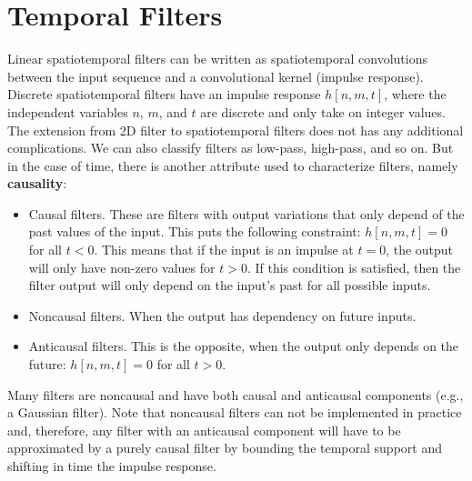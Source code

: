 \section{Temporal Filters}

Linear spatiotemporal filters can be written as spatiotemporal convolutions between the input sequence and a convolutional kernel (impulse response). 
Discrete spatiotemporal filters have an impulse response $h \left[n,m,t \right]$, where the independent variables $n$, $m$, and $t$ are discrete and only take on integer values. The extension from 2D filter to spatiotemporal filters does not has any additional complications. We can also classify filters as low-pass, high-pass, and so on. But in the case of time, there is another attribute used to characterize filters, namely {\bf causality}: 
\begin{itemize} 
\item Causal filters. 
These are filters with output variations that only depend of the past values of the input. This puts the following constraint: $h \left[n,m,t \right]=0$ for all $t<0$. This means that if the input is an impulse at $t=0$, the output will only have non-zero values for $t>0$. If this condition is satisfied, then the filter output will only depend on the input's past for all possible inputs. 
\item Noncausal filters. When the output has dependency on future inputs.
\item Anticausal filters. 
This is the opposite, when the output only depends on the future: $h \left[n,m,t \right]=0$ for all $t>0$.
\end{itemize}
Many filters are noncausal and have both causal and anticausal components (e.g., a Gaussian filter). Note that noncausal filters can not be implemented in practice and, therefore, any filter with an anticausal component will have to be approximated by a purely causal filter by bounding the temporal support and shifting in time the impulse response. 

